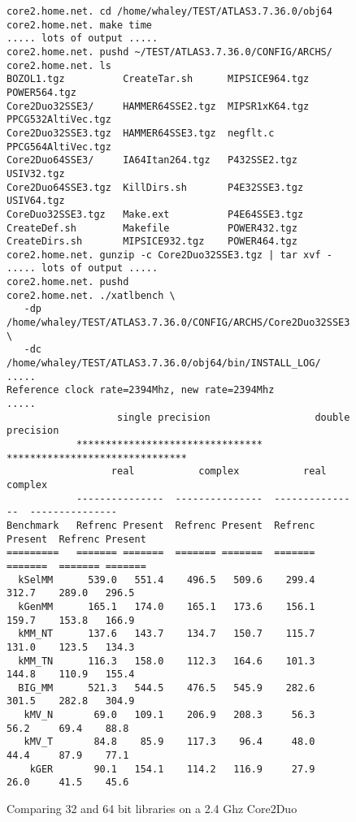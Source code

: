 \documentclass[11pt]{article}
\begin{document}
\begin{figure}[htbp]
\begin{footnotesize}
\begin{verbatim}
core2.home.net. cd /home/whaley/TEST/ATLAS3.7.36.0/obj64
core2.home.net. make time
..... lots of output .....
core2.home.net. pushd ~/TEST/ATLAS3.7.36.0/CONFIG/ARCHS/
core2.home.net. ls
BOZOL1.tgz          CreateTar.sh      MIPSICE964.tgz  POWER564.tgz
Core2Duo32SSE3/     HAMMER64SSE2.tgz  MIPSR1xK64.tgz  PPCG532AltiVec.tgz
Core2Duo32SSE3.tgz  HAMMER64SSE3.tgz  negflt.c        PPCG564AltiVec.tgz
Core2Duo64SSE3/     IA64Itan264.tgz   P432SSE2.tgz    USIV32.tgz
Core2Duo64SSE3.tgz  KillDirs.sh       P4E32SSE3.tgz   USIV64.tgz
CoreDuo32SSE3.tgz   Make.ext          P4E64SSE3.tgz
CreateDef.sh        Makefile          POWER432.tgz
CreateDirs.sh       MIPSICE932.tgz    POWER464.tgz
core2.home.net. gunzip -c Core2Duo32SSE3.tgz | tar xvf -
..... lots of output .....
core2.home.net. pushd
core2.home.net. ./xatlbench \
   -dp /home/whaley/TEST/ATLAS3.7.36.0/CONFIG/ARCHS/Core2Duo32SSE3 \
   -dc /home/whaley/TEST/ATLAS3.7.36.0/obj64/bin/INSTALL_LOG/
.....
Reference clock rate=2394Mhz, new rate=2394Mhz
.....
                   single precision                  double precision
            ********************************   *******************************
                  real           complex           real           complex
            ---------------  ---------------  ---------------  ---------------
Benchmark   Refrenc Present  Refrenc Present  Refrenc Present  Refrenc Present
=========   ======= =======  ======= =======  ======= =======  ======= =======
  kSelMM      539.0   551.4    496.5   509.6    299.4   312.7    289.0   296.5
  kGenMM      165.1   174.0    165.1   173.6    156.1   159.7    153.8   166.9
  kMM_NT      137.6   143.7    134.7   150.7    115.7   131.0    123.5   134.3
  kMM_TN      116.3   158.0    112.3   164.6    101.3   144.8    110.9   155.4
  BIG_MM      521.3   544.5    476.5   545.9    282.6   301.5    282.8   304.9
   kMV_N       69.0   109.1    206.9   208.3     56.3    56.2     69.4    88.8
   kMV_T       84.8    85.9    117.3    96.4     48.0    44.4     87.9    77.1
    kGER       90.1   154.1    114.2   116.9     27.9    26.0     41.5    45.6
\end{verbatim}
\end{footnotesize}
\caption{Comparing 32 and 64 bit libraries on a 2.4 Ghz Core2Duo}
\label{fig-tim-32v64}
\end{figure}
\end{document}
